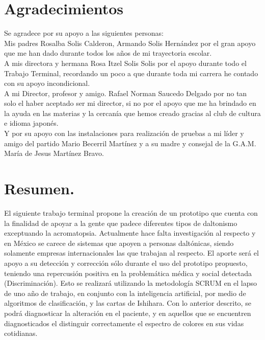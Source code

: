 \documentclass[10pt]{article}
\begin{document}
\newpage
 
\section{Agradecimientos}

Se agradece por su apoyo a las siguientes personas: \\
 Mis padres Rosalba Solis Calderon, Armando Solis Hernández por el gran apoyo que me han dado durante todos los años de mi trayectoria escolar.\\
 
A mis directora y hermana  Rosa Itzel Solis Solis por el apoyo durante todo el Trabajo Terminal, recordando un poco a que durante toda mi carrera he contado con su apoyo incondicional.\\

A mi Director, profesor y amigo. Rafael Norman Saucedo Delgado por no tan solo el haber aceptado ser mi director, si no por el apoyo que me ha brindado en la ayuda en las materias y la cercanía que hemos creado gracias al club de cultura e idioma japonés. \\
Y por su apoyo con las instalaciones para realización de pruebas a mi líder y amigo del partido Mario Becerril Martínez y a su madre y consejal de la G.A.M. María de Jesus Martínez Bravo.

\newpage

\tableofcontents 
\newpage
\listoffigures
\newpage
\listoftables

\newpage


 
\section{Resumen.}

 El siguiente trabajo terminal propone la creación de un prototipo que cuenta con la finalidad de apoyar a la gente que padece diferentes tipos de daltonismo exceptuando la acromatopsia. Actualmente hace falta investigación al respecto y en México se carece de sistemas que apoyen a personas daltónicas, siendo solamente empresas internacionales las que trabajan al respecto. El aporte será el apoyo a su detección y corrección sólo durante el uso del prototipo propuesto, teniendo una repercusión positiva en la problemática médica y social detectada (Discriminación). Esto se realizará utilizando la metodología SCRUM en el lapso de uno año de trabajo, en conjunto con la inteligencia artificial, por medio de algoritmos de clasificación, y las cartas de Ishihara. Con lo anterior descrito, se podrá diagnosticar la alteración en el paciente, y en aquellos que se encuentren diagnosticados el distinguir correctamente el espectro de colores en sus vidas cotidianas.
\end{document}
